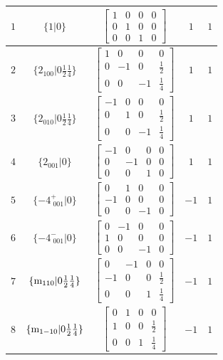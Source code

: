 \documentclass[fleqn,8pt]{jsarticle}
\begin{document}
\begin{longtable}{ccccc}
$ 1 $ & $ \{1|0\} $ & $ \begin{bmatrix} 1 & 0 & 0 & 0 \\ 0 & 1 & 0 & 0 \\ 0 & 0 & 1 & 0 \end{bmatrix} $ & $ 1 $ & $ 1 $ \\ \hline
$ 2 $ & $ \{2{}_{100}|0 \frac{1}{2} \frac{1}{4}\} $ & $ \begin{bmatrix} 1 & 0 & 0 & 0 \\ 0 & -1 & 0 & \frac{1}{2} \\ 0 & 0 & -1 & \frac{1}{4} \end{bmatrix} $ & $ 1 $ & $ 1 $ \\ \hline
$ 3 $ & $ \{2{}_{010}|0 \frac{1}{2} \frac{1}{4}\} $ & $ \begin{bmatrix} -1 & 0 & 0 & 0 \\ 0 & 1 & 0 & \frac{1}{2} \\ 0 & 0 & -1 & \frac{1}{4} \end{bmatrix} $ & $ 1 $ & $ 1 $ \\ \hline
$ 4 $ & $ \{2{}_{001}|0\} $ & $ \begin{bmatrix} -1 & 0 & 0 & 0 \\ 0 & -1 & 0 & 0 \\ 0 & 0 & 1 & 0 \end{bmatrix} $ & $ 1 $ & $ 1 $ \\ \hline
$ 5 $ & $ \{-4^{+}_{\,\,001}|0\} $ & $ \begin{bmatrix} 0 & 1 & 0 & 0 \\ -1 & 0 & 0 & 0 \\ 0 & 0 & -1 & 0 \end{bmatrix} $ & $ -1 $ & $ 1 $ \\ \hline
$ 6 $ & $ \{-4^{-}_{\,\,001}|0\} $ & $ \begin{bmatrix} 0 & -1 & 0 & 0 \\ 1 & 0 & 0 & 0 \\ 0 & 0 & -1 & 0 \end{bmatrix} $ & $ -1 $ & $ 1 $ \\ \hline
$ 7 $ & $ \{{\rm m}_{110}|0 \frac{1}{2} \frac{1}{4}\} $ & $ \begin{bmatrix} 0 & -1 & 0 & 0 \\ -1 & 0 & 0 & \frac{1}{2} \\ 0 & 0 & 1 & \frac{1}{4} \end{bmatrix} $ & $ -1 $ & $ 1 $ \\ \hline
$ 8 $ & $ \{{\rm m}_{1-10}|0 \frac{1}{2} \frac{1}{4}\} $ & $ \begin{bmatrix} 0 & 1 & 0 & 0 \\ 1 & 0 & 0 & \frac{1}{2} \\ 0 & 0 & 1 & \frac{1}{4} \end{bmatrix} $ & $ -1 $ & $ 1 $ \\ \hline

\end{longtable}
\end{document}
